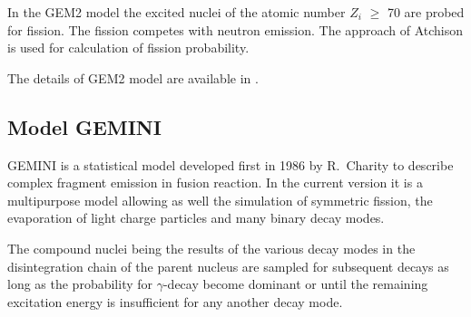 In the GEM2 model the excited nuclei of the atomic number $Z_i$ $\ge$ 70 are probed for fission. The fission competes with neutron emission. The approach of Atchison \cite{Atchison1980} 
is used for calculation of fission probability.

The details of GEM2 model are available in  \cite{FURIHATA2000,Furihata2002}.


\subsection{Model GEMINI}

GEMINI is a statistical model developed first  in 1986 by R.~Charity \cite{CHARITY1988,Charity2010} to describe complex fragment emission in fusion reaction. 
In the current version it is a multipurpose model allowing as well the simulation of symmetric fission, the evaporation of light charge particles and many binary decay modes.

The compound nuclei being the results of the various decay modes in the disintegration chain of the parent nucleus
are sampled for subsequent decays as long as the 
 probability for $\gamma$-decay become dominant or until the remaining excitation energy is insufficient for 
any another decay mode. 


